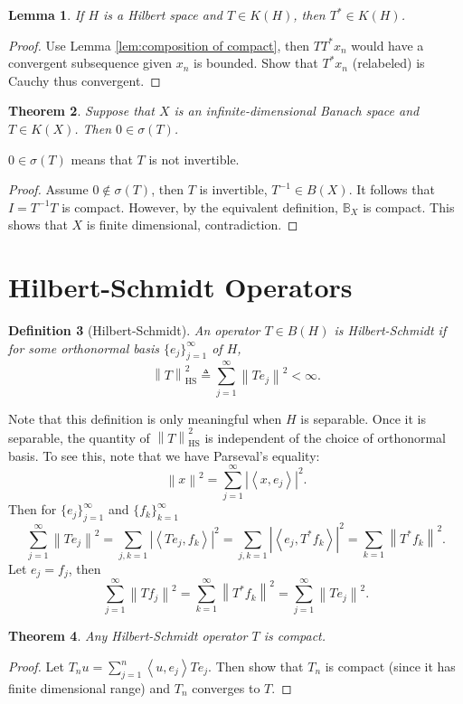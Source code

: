 \documentclass[12pt,a4paper]{report}
\numberwithin{equation}{section}
\theoremstyle{mystyle}
\newtheorem{definition}{Definition}[section]
\newtheorem{theorem}[definition]{Theorem}
\newtheorem{lemma}[definition]{Lemma}
\newcommand{\abs}[1]{\left\lvert #1 \right\rvert}
\newcommand{\norm}[1]{\left\lVert #1 \right\rVert}
\newcommand{\inner}[1]{\left\langle #1 \right\rangle}
\begin{document}
	
	\begin{lemma}
		If $H$ is a Hilbert space and $T\in K(H)$, then $T^*\in K(H)$.
	\end{lemma}
	\begin{proof}
		Use Lemma \ref{lem:composition of compact}, then $TT^*x_n$ would have a convergent subsequence given $x_n$ is bounded. Show that $T^* x_n$ (relabeled) is Cauchy thus convergent.
	\end{proof}

	\begin{theorem}
		Suppose that $X$ is an infinite-dimensional Banach space and $T\in K(X)$. Then $0\in \sigma(T)$.
	\end{theorem}
	$0\in \sigma(T)$ means that $T$ is not invertible.
	\begin{proof}
		Assume $0\notin \sigma(T)$, then $T$ is invertible, $T^{-1}\in B(X)$. It follows that $I=T^{-1}T$ is compact. However, by the equivalent definition, $\mathbb{B}_X$ is compact. This shows that $X$ is finite dimensional, contradiction.
	\end{proof}
	
	\section{Hilbert-Schmidt Operators}
	\begin{definition}[Hilbert-Schmidt]
		An operator $T\in B(H)$ is \emph{Hilbert-Schmidt} if for some orthonormal basis $\{e_j\}_{j=1}^\infty$ of $H$,
		$$
		\norm{T}^2_{\text{HS}} \triangleq \sum_{j=1}^\infty \norm{Te_j}^2 < \infty.
		$$
	\end{definition}
	Note that this definition is only meaningful when $H$ is separable. Once it is separable, the quantity of $\norm{T}^2_{\text{HS}}$ is independent of the choice of orthonormal basis. To see this, note that we have Parseval's equality:
	$$
	\norm{x}^2 = \sum_{j=1}^\infty \abs{\inner{x,e_j}}^2.
	$$
	Then for $\{e_j\}_{j=1}^\infty$ and $\{f_k\}_{k=1}^\infty$
	$$
	\sum_{j=1}^\infty \norm{Te_j}^2 = \sum_{j,k=1}\abs{\inner{Te_j,f_k}}^2 = \sum_{j,k=1}\abs{\inner{e_j,T^* f_k}}^2 = 
	\sum_{k=1}\norm{T^*f_k}^2.
	$$
	Let $e_j=f_j$, then
	$$
	\sum_{j=1}^\infty \norm{Tf_j}^2 = \sum_{k=1}^\infty \norm{T^* f_k}^2 = \sum_{j=1}^\infty \norm{Te_j}^2.
	$$
	
	\begin{theorem}
		Any Hilbert-Schmidt operator $T$ is compact.
	\end{theorem}
	\begin{proof}
		Let $T_n u= \sum_{j=1}^n \inner{u,e_j} Te_j$. Then show that $T_n$ is compact (since it has finite dimensional range) and $T_n$ converges to $T$.
	\end{proof}
\end{document}
